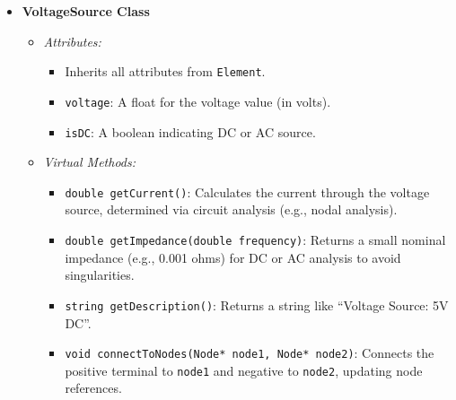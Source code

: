 \documentclass{article}
\begin{document}
\begin{enumerate}
\begin{itemize}
        \item \textbf{VoltageSource Class}
        \begin{itemize}
            \item \textit{Attributes:}
            \begin{itemize}
                \item Inherits all attributes from \texttt{Element}.
                \item \texttt{voltage}: A float for the voltage value (in volts).
                \item \texttt{isDC}: A boolean indicating DC or AC source.
            \end{itemize}
            \item \textit{Virtual Methods:}
            \begin{itemize}
                \item \texttt{double getCurrent()}: Calculates the current through the voltage source, determined via circuit analysis (e.g., nodal analysis).
                \item \texttt{double getImpedance(double frequency)}: Returns a small nominal impedance (e.g., 0.001 ohms) for DC or AC analysis to avoid singularities.
                \item \texttt{string getDescription()}: Returns a string like “Voltage Source: 5V DC”.
                \item \texttt{void connectToNodes(Node* node1, Node* node2)}: Connects the positive terminal to \texttt{node1} and negative to \texttt{node2}, updating node references.
            \end{itemize}
        \end{itemize}


\end{itemize}
\end{enumerate}
\end{document}
